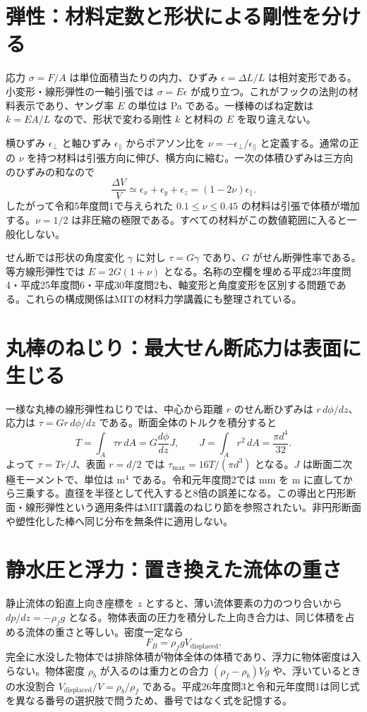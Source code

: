 \section{弾性：材料定数と形状による剛性を分ける}
\label{theory:mechanics:elasticity}
応力 $\sigma=F/A$ は単位面積当たりの内力、ひずみ $\epsilon=\Delta L/L$ は相対変形である。小変形・線形弾性の一軸引張では $\sigma=E\epsilon$ が成り立つ。これがフックの法則の材料表示であり、ヤング率 $E$ の単位は Pa である。一様棒のばね定数は $k=EA/L$ なので、形状で変わる剛性 $k$ と材料の $E$ を取り違えない。

横ひずみ $\epsilon_\perp$ と軸ひずみ $\epsilon_\parallel$ からポアソン比を $\nu=-\epsilon_\perp/\epsilon_\parallel$ と定義する。通常の正の $\nu$ を持つ材料は引張方向に伸び、横方向に縮む。一次の体積ひずみは三方向のひずみの和なので
\[
 \frac{\Delta V}{V}\simeq\epsilon_x+\epsilon_y+\epsilon_z=(1-2\nu)\epsilon_\parallel.
\]
したがって令和5年度問1で与えられた $0.1\leq\nu\leq0.45$ の材料は引張で体積が増加する。$\nu=1/2$ は非圧縮の極限である。すべての材料がこの数値範囲に入ると一般化しない。

せん断では形状の角度変化 $\gamma$ に対し $\tau=G\gamma$ であり、$G$ がせん断弾性率である。等方線形弾性では $E=2G(1+\nu)$ となる。名称の空欄を埋める平成23年度問4・平成25年度問6・平成30年度問2も、軸変形と角度変形を区別する問題である。これらの構成関係はMITの材料力学講義にも整理されている\cite{mit_torsion}。

\section{丸棒のねじり：最大せん断応力は表面に生じる}
\label{theory:mechanics:torsion}
一様な丸棒の線形弾性ねじりでは、中心から距離 $r$ のせん断ひずみは $r\,d\phi/dz$、応力は $\tau=Gr\,d\phi/dz$ である。断面全体のトルクを積分すると
\[
 T=\int_A\tau r\,dA=G\frac{d\phi}{dz}J,
 \qquad J=\int_A r^2\,dA=\frac{\pi d^4}{32}.
\]
よって $\tau=Tr/J$、表面 $r=d/2$ では $\tau_{\max}=16T/(\pi d^3)$ となる。$J$ は断面二次極モーメントで、単位は $\mathrm{m^4}$ である。令和元年度問2では mm を m に直してから三乗する。直径を半径として代入すると8倍の誤差になる。この導出と円形断面・線形弾性という適用条件はMIT講義のねじり節を参照されたい\cite{mit_torsion}。非円形断面や塑性化した棒へ同じ分布を無条件に適用しない。

\section{静水圧と浮力：置き換えた流体の重さ}
\label{theory:mechanics:hydrostatics}
静止流体の鉛直上向き座標を $z$ とすると、薄い流体要素の力のつり合いから $dp/dz=-\rho_f g$ となる。物体表面の圧力を積分した上向き合力は、同じ体積を占める流体の重さと等しい。密度一定なら
\[
 F_B=\rho_f gV_{\mathrm{displaced}}.
\]
完全に水没した物体では排除体積が物体全体の体積であり、浮力に物体密度は入らない。物体密度 $\rho_b$ が入るのは重力との合力 $(\rho_f-\rho_b)Vg$ や、浮いているときの水没割合 $V_{\mathrm{displaced}}/V=\rho_b/\rho_f$ である。平成26年度問3と令和元年度問1は同じ式を異なる番号の選択肢で問うため、番号ではなく式を記憶する。

